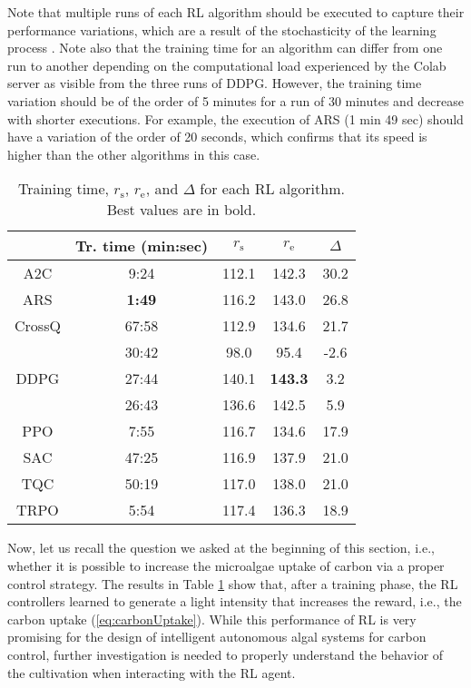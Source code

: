 \documentclass[lettersize,journal]{IEEEtran}
\begin{document}
Note that multiple runs of each RL algorithm should be executed to capture their performance variations, which are a result of the stochasticity of the learning process \cite{NEURIPS2018_7634ea65}. Note also that the training time for an algorithm can differ from one run to another depending on the computational load experienced by the Colab server as visible from the three runs of DDPG. However, the training time variation should be of the order of 5 minutes for a run of 30 minutes and decrease with shorter executions. For example, the execution of ARS (1 min 49 sec) should have a variation of the order of 20 seconds, which confirms that its speed is higher than the other algorithms in this case.      
\begin{table}
\centering
\caption{Training time, $r_\text{s}$, $r_\text{e}$, and $\Delta$ for each RL algorithm. Best values are in bold.}
\label{tab:RLresults}
\begin{tabular}{ccccc} 
 & Tr. time (min:sec) & $r_\text{s}$ & $r_\text{e}$ & $\Delta$ \\ 
\hline
A2C & 9:24 & 112.1 & 142.3 & 30.2 \\
ARS & \textbf{1:49} & 116.2 & 143.0 & 26.8 \\
CrossQ & 67:58 & 112.9 & 134.6 & 21.7\\
\hline
\multirow{3}{*}{DDPG} & 30:42 & 98.0 & 95.4 & -2.6\\
	& 27:44 & 140.1 & \textbf{143.3} & 3.2 \\
	& 26:43 & 136.6 & 142.5 & 5.9\\
\hline
PPO & 7:55 & 116.7 & 134.6 & 17.9\\
SAC & 47:25 & 116.9 & 137.9 & 21.0\\
TQC & 50:19 & 117.0 & 138.0 & 21.0 \\
TRPO & 5:54 & 117.4 & 136.3 & 18.9 \\
\hline
\end{tabular}
\end{table}

Now, let us recall the question we asked at the beginning of this section, i.e., whether it is possible to increase the microalgae uptake of carbon via a proper control strategy. The results in Table \ref{tab:RLresults} show that, after a training phase, the RL controllers learned to generate a light intensity that increases the reward, i.e., the carbon uptake (\ref{eq:carbonUptake}). While this performance of RL is very promising for the design of intelligent autonomous algal systems for carbon control, further investigation is needed to properly understand the behavior of the cultivation when interacting with the RL agent.   
\end{document}
